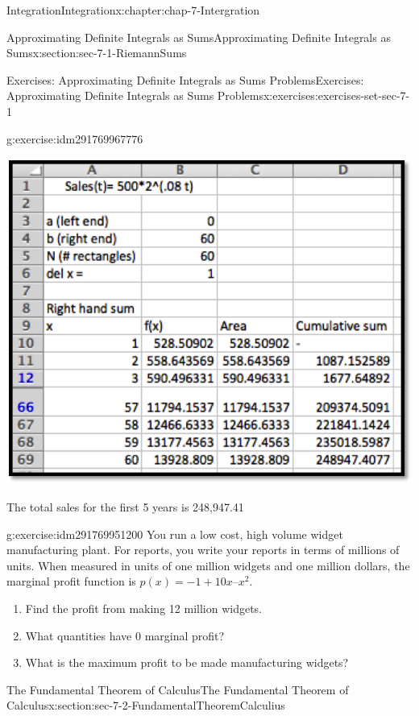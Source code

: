 \documentclass[oneside,10pt,]{book}
\numberwithin{equation}{section}
\begin{document}
\begin{chapterptx}{Integration}{}{Integration}{}{}{x:chapter:chap-7-Intergration}
\begin{sectionptx}{Approximating Definite Integrals as Sums}{}{Approximating Definite Integrals as Sums}{}{}{x:section:sec-7-1-RiemannSums}
\begin{exercises-subsection}{Exercises: Approximating Definite Integrals as Sums Problems}{}{Exercises: Approximating Definite Integrals as Sums Problems}{}{}{x:exercises:exercises-set-sec-7-1}
\begin{divisionexercise}{11}{}{}{g:exercise:idm291769967776}
\begin{enumerate}[label=(\alph*)]
\begin{sidebyside}{1}{0.15}{0.15}{0}
\begin{sbspanel}{0.7}
\includegraphics[width=\linewidth]{images/sec7-1-sol11d.png}
\end{sbspanel}%
\end{sidebyside}%
\par
The total sales for the first 5 years is \textdollar{}248,947.41%
\end{enumerate}
\end{divisionexercise}%
\begin{divisionexercise}{12}{}{}{g:exercise:idm291769951200}%
You run a low cost, high volume widget manufacturing plant.  For reports, you write your reports in terms of millions of units.  When measured in units of one million widgets and one million dollars, the marginal profit function is \(p(x) = -1 + 10 x – x^2\).%
%
\begin{enumerate}[label=(\alph*)]
\item{}Find the profit from making 12 million widgets.%
\item{}What quantities have 0 marginal profit?%
\item{}What is the maximum profit to be made manufacturing widgets?%
\end{enumerate}
\end{divisionexercise}%
\end{exercises-subsection}
\end{sectionptx}
%
%
\typeout{************************************************}
\typeout{************************************************}
%
\begin{sectionptx}{The Fundamental Theorem of Calculus}{}{The Fundamental Theorem of Calculus}{}{}{x:section:sec-7-2-FundamentalTheoremCalculius}

\end{sectionptx}
\end{chapterptx}
\end{document}
